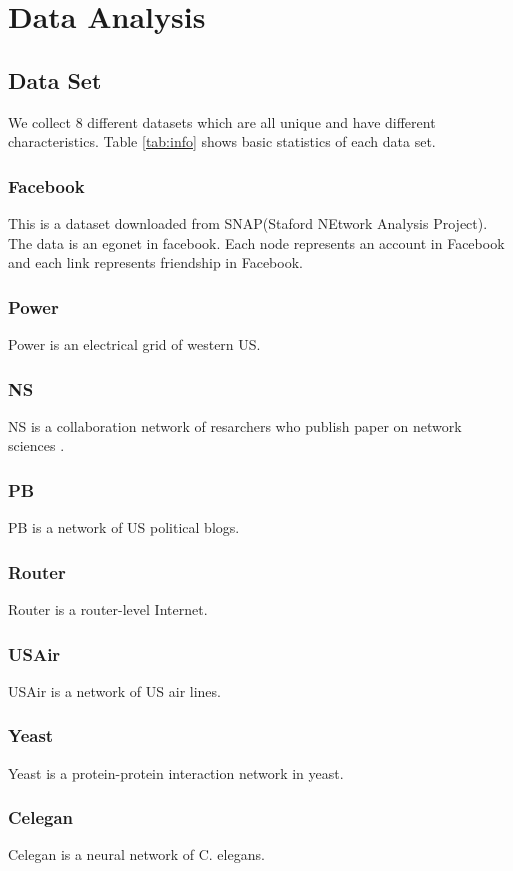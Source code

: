 \documentclass[12pt]{article}
\begin{document}
	\section{Data Analysis}
	
	\subsection {Data Set}
	We collect 8 different datasets which are all unique and have different characteristics. Table \ref{tab:info} shows basic statistics of each data set.
	\subsubsection{Facebook}
	This is a dataset downloaded from SNAP(Staford NEtwork Analysis Project)\cite{snapnets}. The data is an egonet in facebook. Each node represents an account in Facebook and each link represents friendship in Facebook.
	\subsubsection{Power}
	Power is  an electrical grid of western US\cite{small_world}.
	\subsubsection{NS}
	NS is a collaboration network of resarchers who publish paper on network sciences \cite{Newman_2006}.
	\subsubsection{PB}
	PB is a network of US political blogs.\cite{pb}
	\subsubsection{Router}
	Router is a router-level Internet.\cite{router}
	\subsubsection{USAir}
	USAir is a network of US air lines. \cite{usair}
	\subsubsection{Yeast}
	Yeast is a protein-protein interaction network in yeast.\cite{yeast}
	
	\subsubsection{Celegan}
	Celegan is a neural network of C. elegans.\cite{small_world}
	
\end{document}
